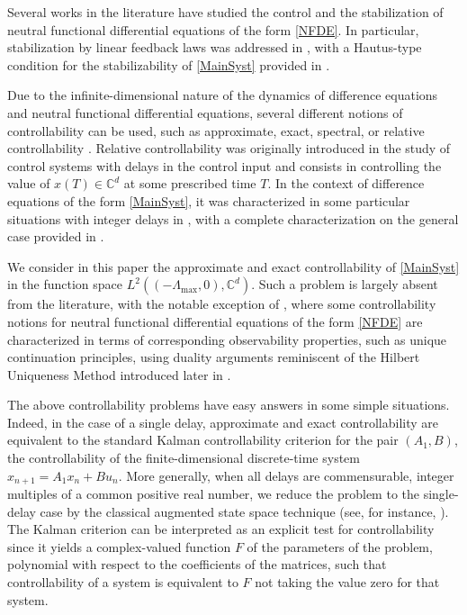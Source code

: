 Several works in the literature have studied the control and the stabilization of neutral functional differential equations of the form \eqref{NFDE}. In particular, stabilization by linear feedback laws was addressed in \cite{Pandolfi1976Stabilization, Hale2002Strong, OConnor1983Stabilization}, with a Hautus-type condition for the stabilizability of \eqref{MainSyst} provided in \cite{Hale2002Strong}.

Due to the infinite-dimensional nature of the dynamics of difference equations and neutral functional differential equations, several different notions of controllability can be used, such as approximate, exact, spectral, or relative controllability \cite{Salamon1984Control, Chyung1970Controllability, Diblik2008Controllability, Pospisil2015Relative, Mazanti2017Relative}. Relative controllability was originally introduced in the study of control systems with delays in the control input \cite{Chyung1970Controllability} and consists in controlling the value of $x(T) \in \mathbb C^d$ at some prescribed time $T$. In the context of difference equations of the form \eqref{MainSyst}, it was characterized in some particular situations with integer delays in \cite{Diblik2008Controllability, Pospisil2015Relative}, with a complete characterization on the general case provided in \cite{Mazanti2017Relative}.

We consider in this paper the approximate and exact controllability of \eqref{MainSyst} in the function space $L^2((-\Lambda_{\max}, 0), \mathbb C^d)$. Such a problem is largely absent from the literature, with the notable exception of \cite{Salamon1984Control, OConnor1983Function}, where some controllability notions for neutral functional differential equations of the form \eqref{NFDE} are characterized in terms of corresponding observability properties, such as unique continuation principles, using duality arguments reminiscent of the Hilbert Uniqueness Method introduced later in \cite{Lions1986Controlabilite, Lions1988Exact}.

The above controllability problems have easy answers in some simple situations. \hbox{Indeed}, in the case of a single delay, approximate and exact controllability are equivalent to the standard Kalman controllability criterion for the pair $(A_1, B)$, \ie the controllability of the finite-dimensional discrete-time system $x_{n+1} = A_1 x_n + B u_n$. More generally, when all delays are commensurable, \ie integer multiples of a common positive real number, we reduce the problem to the single-delay case by the classical augmented state space technique (see, for instance, \cite[Chap.\,4]{Franklin1997Digital}). The Kalman criterion can be interpreted as an explicit test for controllability since it yields a complex-valued function $F$ of the parameters of the problem, polynomial with respect to the coefficients of the matrices, such that controllability of a system is equivalent to $F$ not taking the value zero for that system.

